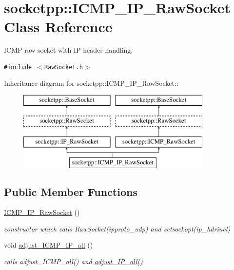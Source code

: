 \hypertarget{classsocketpp_1_1ICMP__IP__RawSocket}{
\section{socketpp::ICMP\_\-IP\_\-RawSocket Class Reference}
\label{classsocketpp_1_1ICMP__IP__RawSocket}
}
ICMP raw socket with IP header handling.  


{\tt \#include $<$RawSocket.h$>$}

Inheritance diagram for socketpp::ICMP\_\-IP\_\-RawSocket::\begin{figure}[H]
\begin{center}
\leavevmode
\includegraphics[height=4cm]{classsocketpp_1_1ICMP__IP__RawSocket}
\end{center}
\end{figure}
\subsection*{Public Member Functions}
\begin{CompactItemize}
\item 
\hypertarget{classsocketpp_1_1ICMP__IP__RawSocket_c94fd53fce785a8b9ac5e53c8b1fb694}{
\hyperlink{classsocketpp_1_1ICMP__IP__RawSocket_c94fd53fce785a8b9ac5e53c8b1fb694}{ICMP\_\-IP\_\-RawSocket} ()}
\label{classsocketpp_1_1ICMP__IP__RawSocket_c94fd53fce785a8b9ac5e53c8b1fb694}

\begin{CompactList}\small\item\em constructor which calls RawSocket(ipproto\_\-udp) and setsockopt(ip\_\-hdrincl) \item\end{CompactList}\item 
\hypertarget{classsocketpp_1_1ICMP__IP__RawSocket_c3f54f7a266586af46e4bfa4494f90d6}{
void \hyperlink{classsocketpp_1_1ICMP__IP__RawSocket_c3f54f7a266586af46e4bfa4494f90d6}{adjust\_\-ICMP\_\-IP\_\-all} ()}
\label{classsocketpp_1_1ICMP__IP__RawSocket_c3f54f7a266586af46e4bfa4494f90d6}

\begin{CompactList}\small\item\em calls adjust\_\-ICMP\_\-all() and \hyperlink{classsocketpp_1_1IP__RawSocket_45e60510233daaa2f279d3a4706fdce5}{adjust\_\-IP\_\-all()} \item\end{CompactList}\end{CompactItemize}
